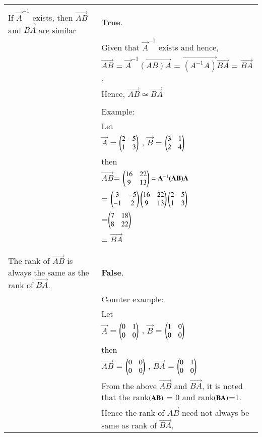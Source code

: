 \documentclass[journal,12pt,twocolumn]{IEEEtran}
\begin{document}
\begin{table}[h]
	\begin{tabular}{|m{3cm}|m{14cm}|}
		\hline
		&\\
	    If $\vec{A}^{-1}$ exists, then $\vec{AB}$ and $\vec{BA}$ are similar
		& \textbf{True}. \\
		& Given that $\vec{A}^{-1}$ exists and hence,\\
		&\qquad\qquad\qquad $\vec{AB}$ = $\vec{A}^{-1}\vec{(AB)A}$ =  $\vec{(A^{-1}A)}\vec{BA}$ = $\vec{BA}$.\\
		& Hence, $\vec{AB} \simeq \vec{BA}$ \\
		&\\
		&Example:\\
		& Let\\
		& \qquad\qquad\qquad$\vec{A}$ = $\begin{pmatrix}2 & 5 \\ 1 & 3\end{pmatrix}$ , 
		$\vec{B}$ = $\begin{pmatrix}3 & 1 \\ 2 & 4\end{pmatrix}$\\
		&then\\
		& \qquad\qquad\qquad$\vec{AB}$\quad= $\begin{pmatrix}16 & 22 \\ 9 & 13\end{pmatrix} = \mathbf{A}^{-1} (\mathbf{AB})\mathbf{A}$\\
		&  \qquad\qquad\qquad  \qquad\qquad\qquad\quad= $\begin{pmatrix}3 & -5\\ -1 & 2\end{pmatrix}\begin{pmatrix}16 & 22 \\ 9 & 13\end{pmatrix}\begin{pmatrix}2 & 5 \\ 1 & 3\end{pmatrix}$\\
		&  \qquad\qquad\qquad \qquad\qquad\qquad\quad=$\begin{pmatrix}7 & 18 \\ 8 & 22\end{pmatrix} $\\
		&  \qquad\qquad\qquad \qquad\qquad\qquad\quad= $\vec{BA}$\\
		&\\
		\hline
		&\\
	    The rank of $\vec{AB}$  is always the same as the rank of $\vec{BA}$.
		& \textbf{False}. \\
		&Counter example:\\
		& Let\\
		& \qquad\qquad\qquad$\vec{A}$ = $\begin{pmatrix}0 & 1 \\ 0 & 0\end{pmatrix}$ , 
		$\vec{B}$ = $\begin{pmatrix}1 & 0 \\ 0 & 0\end{pmatrix}$\\
		&then\\
		& \qquad\qquad\qquad$\vec{AB}$ = $\begin{pmatrix}0 & 0 \\ 0 & 0\end{pmatrix}$ ,  $\vec{BA}$ = $\begin{pmatrix}0 & 1 \\ 0 & 0\end{pmatrix}$\\
		& From the above $\vec{AB}$ and $\vec{BA}$, it is noted that the rank$\left(\mathbf{AB}\right)$ = 0 and rank$\left(\mathbf{BA}\right)$=1. \\
		& Hence the rank of $\vec{AB}$ need not always be same as rank of $\vec{BA}$.
		\\
		\hline
	\end{tabular}
\end{table}
\end{document}

